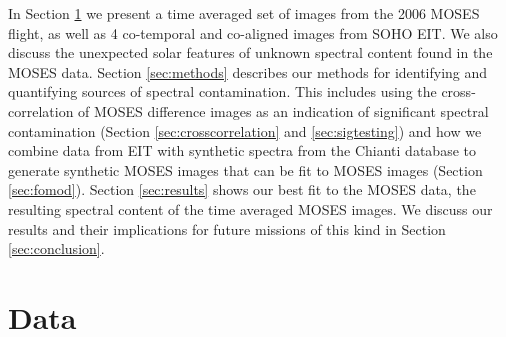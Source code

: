 	In Section \ref{sec:data} we present a time averaged set of images from the 2006 MOSES flight, as well as 4 co-temporal and co-aligned images from SOHO EIT.
	We also discuss the unexpected solar features of unknown spectral content found in the MOSES data.
	Section \ref{sec:methods} describes our methods for identifying and quantifying sources of spectral contamination.  
	This includes using the cross-correlation of MOSES difference images as an indication of significant spectral contamination (Section \ref{sec:crosscorrelation} and \ref{sec:sigtesting}) and how we combine data from EIT with synthetic spectra from the Chianti database \citep{ChiantiI,ChiantiX} to generate synthetic MOSES images that can be fit to MOSES images (Section \ref{sec:fomod}).
	Section \ref{sec:results} shows our best fit to the MOSES data, the resulting spectral content of the time averaged MOSES images.
	We discuss our results and their implications for future missions of this kind in Section \ref{sec:conclusion}.   


\section{Data}\label{sec:data}

%	
%	
%	

